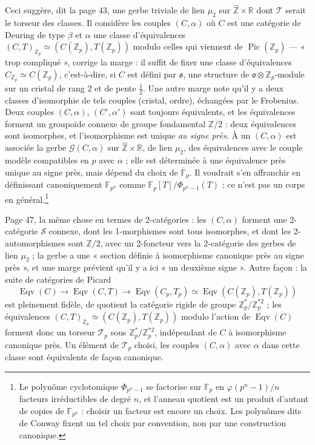 \documentclass[11pt,a4paper]{article}
\begin{document}
Ceci suggère, dit la page 43, une gerbe triviale de lien $\mu_{2}$ sur
$\widehat{\mathbb{Z}} \times \mathbb{R}$ dont $\mathcal{T}$ serait le torseur
des classes. Il considère les couples $(C, \alpha)$ où $C$ est une catégorie de
Deuring de type $\beta$ et $\alpha$ une classe d'équivalences
$(C, T)_{\mathbb{Z}_{p}} \simeq (C(\mathbb{Z}_{p}), T(\mathbb{Z}_{p}))$ modulo
celles qui viennent de $\operatorname{Pic}(\mathbb{Z}_{p})$ --- « trop
compliqué », corrige la marge : il suffit de fixer une classe d'équivalences
$C_{\mathbb{Z}_{p}} \simeq C(\mathbb{Z}_{p})$, c'est-à-dire, si $C$ est défini
par $\mathfrak{o}$, une structure de $\mathfrak{o} \otimes \mathbb{Z}_{p}$-module
sur un cristal de rang $2$ et de pente $\tfrac{1}{2}$. Une autre marge note
qu'il y a deux classes d'isomorphie de tels couples (cristal, ordre), échangées
par le Frobenius. Deux couples $(C, \alpha)$, $(C', \alpha')$ sont toujours
équivalents, et les équivalences forment un groupoïde connexe de groupe
fondamental $\mathbb{Z}/2$ : deux équivalences sont isomorphes, et l'isomorphisme
est unique \emph{au signe près}. À un $(C, \alpha)$ est associée la gerbe
$\mathcal{G}(C, \alpha)$ sur $\widehat{\mathbb{Z}} \times \mathbb{R}$, de lien
$\mu_{2}$, des équivalences avec le couple modèle compatibles en $p$ avec
$\alpha$ ; elle est déterminée à une équivalence près unique au signe près,
mais dépend du choix de $\overline{\mathbb{F}}_{p}$. Il voudrait s'en affranchir
en définissant canoniquement $\mathbb{F}_{p^{n}}$ comme
$\mathbb{F}_{p}[T]/\Phi_{p^{n}-1}(T)$ ; ce n'est pas un corps en
général.\footnote{Le polynôme cyclotomique $\Phi_{p^{n}-1}$ se factorise sur
$\mathbb{F}_{p}$ en $\varphi(p^{n}-1)/n$ facteurs irréductibles de degré $n$, et
l'anneau quotient est un produit d'autant de copies de $\mathbb{F}_{p^{n}}$ :
choisir un facteur est encore un choix. Les polynômes dits de Conway fixent un
tel choix par convention, non par une construction canonique.}

Page 47, la même chose en termes de 2-catégories : les $(C, \alpha)$ forment une
2-catégorie $\mathcal{S}$ connexe, dont les 1-morphismes sont tous isomorphes,
et dont les 2-automorphismes sont $\mathbb{Z}/2$, avec un 2-foncteur vers la
2-catégorie des gerbes de lien $\mu_{2}$ ; la gerbe a une « section définie à
isomorphisme canonique près au signe près », et une marge prévient qu'il y a ici
« un deuxième signe ». Autre façon : la suite de catégories de Picard
\[
  \operatorname{Eqv}(C) \longrightarrow \operatorname{Eqv}(C, T)
  \longrightarrow \operatorname{Eqv}(C_{p}, T_{p}) \simeq
  \operatorname{Eqv}(C(\mathbb{Z}_{p}), T(\mathbb{Z}_{p}))
\]
est pleinement fidèle, de quotient la catégorie rigide de groupe
$\mathbb{Z}_{p}^{*}/\mathbb{Z}_{p}^{*2}$ ; les équivalences
$(C, T)_{\mathbb{Z}_{p}} \simeq (C(\mathbb{Z}_{p}), T(\mathbb{Z}_{p}))$ modulo
l'action de $\operatorname{Eqv}(C)$ forment donc un torseur $\mathcal{T}_{p}$
sous $\mathbb{Z}_{p}^{*}/\mathbb{Z}_{p}^{*2}$, indépendant de $C$ à isomorphisme
canonique près. Un élément de $\mathcal{T}_{p}$ choisi, les couples $(C,
\alpha)$ avec $\alpha$ dans cette classe sont équivalents de façon canonique.
\end{document}
